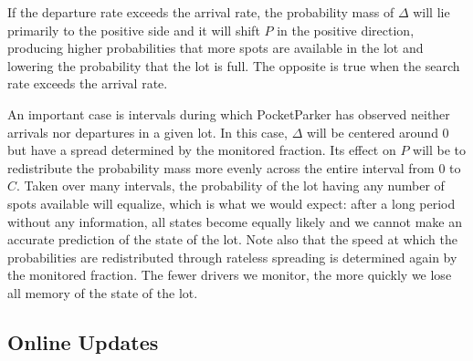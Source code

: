 If the departure rate exceeds the arrival rate, the probability mass of
$\Delta$ will lie primarily to the positive side and it will shift $P$ in the
positive direction, producing higher probabilities that more spots are
available in the lot and lowering the probability that the lot is full. The
opposite is true when the search rate exceeds the arrival rate.

An important case is intervals during which PocketParker has observed neither
arrivals nor departures in a given lot. In this case, $\Delta$ will be
centered around $0$ but have a spread determined by the monitored fraction.
Its effect on $P$ will be to redistribute the probability mass more evenly
across the entire interval from $0$ to $C$. Taken over many intervals, the
probability of the lot having any number of spots available will equalize,
which is what we would expect: after a long period without any information,
all states become equally likely and we cannot make an accurate prediction of
the state of the lot. Note also that the speed at which the probabilities are
redistributed through rateless spreading is determined again by the monitored
fraction. The fewer drivers we monitor, the more quickly we lose all memory
of the state of the lot.

\subsection{Online Updates}
\label{subsec-online}

